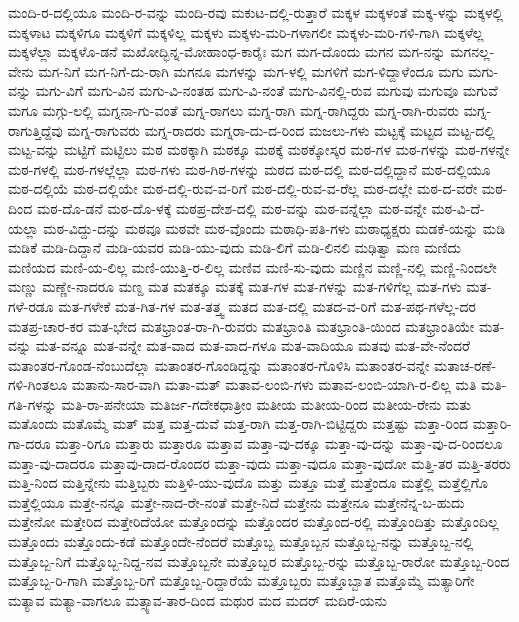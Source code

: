 {ಮಂದಿ-ರ-ದಲ್ಲಿಯೂ
ಮಂದಿ-ರ-ವನ್ನು
ಮಂದಿ-ರವು
ಮಕುಟ-ದಲ್ಲಿ-ರುತ್ತಾರೆ
ಮಕ್ಕಳ
ಮಕ್ಕಳಂತೆ
ಮಕ್ಕ-ಳನ್ನು
ಮಕ್ಕಳಲ್ಲಿ
ಮಕ್ಕಳಾಟ
ಮಕ್ಕಳಿಗೂ
ಮಕ್ಕಳಿಗೆ
ಮಕ್ಕಳಿಲ್ಲ
ಮಕ್ಕಳು
ಮಕ್ಕಳು-ಮರಿ-ಗಳಾಗಲೀ
ಮಕ್ಕಳು-ಮರಿ-ಗಳಿ-ಗಾಗಿ
ಮಕ್ಕಳೆಲ್ಲ
ಮಕ್ಕಳೆಲ್ಲಾ
ಮಕ್ಕಳೊ-ಡನೆ
ಮಖೋದ್ಭಿನ್ನ-ಮೋಹಾಂಧ-ಕಾರೈಃ
ಮಗ
ಮಗ-ದೊಂದು
ಮಗನ
ಮಗ-ನನ್ನು
ಮಗನಲ್ಲ-ವೇನು
ಮಗ-ನಿಗೆ
ಮಗ-ನಿಗೆ-ದು-ರಾಗಿ
ಮಗನೂ
ಮಗಳನ್ನು
ಮಗ-ಳಲ್ಲಿ
ಮಗಳಿಗೆ
ಮಗ-ಳಿದ್ದಾಳೆಂದೂ
ಮಗು
ಮಗು-ವನ್ನು
ಮಗು-ವಿಗೆ
ಮಗು-ವಿನ
ಮಗು-ವಿ-ನಂತಹ
ಮಗು-ವಿ-ನಂತೆ
ಮಗು-ವಿನಲ್ಲಿ-ರುವ
ಮಗುವು
ಮಗುವೂ
ಮಗುವೆ
ಮಗೂ
ಮಗ್ಗು-ಲಲ್ಲಿ
ಮಗ್ನನಾ-ಗು-ವಂತೆ
ಮಗ್ನ-ರಾಗಲು
ಮಗ್ನ-ರಾಗಿ
ಮಗ್ನ-ರಾಗಿದ್ದರು
ಮಗ್ನ-ರಾಗಿ-ರುವರು
ಮಗ್ನ-ರಾಗುತ್ತಿದ್ದೆವು
ಮಗ್ನ-ರಾಗುವರು
ಮಗ್ನ-ರಾದರು
ಮಗ್ನರಾ-ದು-ದ-ರಿಂದ
ಮಜಲು-ಗಳು
ಮಟ್ಟಕ್ಕೆ
ಮಟ್ಟದ
ಮಟ್ಟ-ದಲ್ಲಿ
ಮಟ್ಟ-ವನ್ನು
ಮಟ್ಟಿಗೆ
ಮಟ್ಟಿಲು
ಮಠ
ಮಠಕ್ಕಾಗಿ
ಮಠಕ್ಕೂ
ಮಠಕ್ಕೆ
ಮಠಕ್ಕೋಸ್ಕರ
ಮಠ-ಗಳ
ಮಠ-ಗಳನ್ನು
ಮಠ-ಗಳನ್ನೇ
ಮಠ-ಗಳಲ್ಲಿ
ಮಠ-ಗಳಲ್ಲೆಲ್ಲಾ
ಮಠ-ಗಳು
ಮಠ-ಗಿಠ-ಗಳನ್ನು
ಮಠದ
ಮಠ-ದಲ್ಲಿ
ಮಠ-ದಲ್ಲಿದ್ದಾನೆ
ಮಠ-ದಲ್ಲಿಯೂ
ಮಠ-ದಲ್ಲಿಯೆ
ಮಠ-ದಲ್ಲಿಯೇ
ಮಠ-ದಲ್ಲಿ-ರುವ-ವ-ರಿಗೆ
ಮಠ-ದಲ್ಲಿ-ರುವ-ವ-ರೆಲ್ಲ
ಮಠ-ದಲ್ಲೇ
ಮಠ-ದ-ವರೇ
ಮಠ-ದಿಂದ
ಮಠ-ದೊ-ಡನೆ
ಮಠ-ದೊ-ಳಕ್ಕೆ
ಮಠಪ್ರ-ದೇಶ-ದಲ್ಲಿ
ಮಠ-ವನ್ನು
ಮಠ-ವನ್ನೆಲ್ಲಾ
ಮಠ-ವನ್ನೇ
ಮಠ-ವಿ-ದೆ-ಯಲ್ಲಾ
ಮಠ-ವಿದ್ದು-ದನ್ನು
ಮಠವೂ
ಮಠವೇ
ಮಠ-ವೊಂದು
ಮಠಾಧಿ-ಪತಿ-ಗಳು
ಮಠಾಧ್ಯಕ್ಷರು
ಮಡಕೆ-ಯನ್ನು
ಮಡಿ
ಮಡಿಕೆ
ಮಡಿ-ದಿದ್ದಾನೆ
ಮಡಿ-ಯವರ
ಮಡಿ-ಯು-ವುದು
ಮಡಿ-ಲಿಗೆ
ಮಡಿ-ಲಿನಲಿ
ಮಢಿತ್ವಾ
ಮಣ
ಮಣಿದು
ಮಣಿಯದ
ಮಣಿ-ಯ-ಲಿಲ್ಲ
ಮಣಿ-ಯುತ್ತಿ-ರ-ಲಿಲ್ಲ
ಮಣಿವ
ಮಣಿ-ಸು-ವುದು
ಮಣ್ಣಿನ
ಮಣ್ಣಿ-ನಲ್ಲಿ
ಮಣ್ಣಿ-ನಿಂದಲೇ
ಮಣ್ಣು
ಮಣ್ಣೇ-ನಾದರೂ
ಮಣ್ದ
ಮತ
ಮತಕ್ಕೂ
ಮತಕ್ಕೆ
ಮತ-ಗಳ
ಮತ-ಗಳನ್ನು
ಮತ-ಗಳಿಗೆಲ್ಲ
ಮತ-ಗಳು
ಮತ-ಗಳೆ-ರಡೂ
ಮತ-ಗಳೇಕೆ
ಮತ-ಗಿತ-ಗಳ
ಮತ-ತತ್ತ್ವ
ಮತದ
ಮತ-ದಲ್ಲಿ
ಮತದ-ವ-ರಿಗೆ
ಮತ-ಪಥ-ಗಳೆಲ್ಲ-ದರ
ಮತಪ್ರ-ಚಾರ-ಕರ
ಮತ-ಭೇದ
ಮತಭ್ರಾಂತ-ರಾ-ಗಿ-ರುವರು
ಮತಭ್ರಾಂತಿ
ಮತಭ್ರಾಂತಿ-ಯಿಂದ
ಮತಭ್ರಾಂತಿಯೇ
ಮತ-ವನ್ನು
ಮತ-ವನ್ನೂ
ಮತ-ವನ್ನೇ
ಮತ-ವಾದ
ಮತ-ವಾದ-ಗಳೂ
ಮತ-ವಾದಿಯೂ
ಮತವು
ಮತ-ವೇ-ನೆಂದರೆ
ಮತಾಂತರ-ಗೊಂಡ-ನೆಂಬುದೆಲ್ಲಾ
ಮತಾಂತರ-ಗೊಂಡಿದ್ದನ್ನು
ಮತಾಂತರ-ಗೊಳಿಸಿ
ಮತಾಂತರ-ವನ್ನೇ
ಮತಾಚ-ರಣೆ-ಗಳಿ-ಗಿಂತಲೂ
ಮತಾನು-ಸಾರ-ವಾಗಿ
ಮತಾ-ಮತ್
ಮತಾವ-ಲಂಬಿ-ಗಳು
ಮತಾವ-ಲಂಬಿ-ಯಾಗಿ-ರ-ಲಿಲ್ಲ
ಮತಿ
ಮತಿ-ಗತಿ-ಗಳನ್ನು
ಮತಿ-ರಾ-ಪನೇಯಾ
ಮತಿರ್ಜ-ಗದೇಕಧಾತ್ರೀಂ
ಮತೀಯ
ಮತೀಯ-ರಿಂದ
ಮತೀಯ-ರೇನು
ಮತು
ಮತೊಂದು
ಮತೊಮ್ಮೆ
ಮತ್
ಮತ್ತ
ಮತ್ತ-ದುವೆ
ಮತ್ತ-ರಾಗಿ
ಮತ್ತ-ರಾಗಿ-ಬಿಟ್ಟಿದ್ದರು
ಮತ್ತಷ್ಟು
ಮತ್ತಾ-ರಿಂದ
ಮತ್ತಾರಿ-ಗಾ-ದರೂ
ಮತ್ತಾ-ರಿಗೂ
ಮತ್ತಾರು
ಮತ್ತಾರೂ
ಮತ್ತಾವ
ಮತ್ತಾ-ವು-ದಕ್ಕೂ
ಮತ್ತಾ-ವು-ದನ್ನು
ಮತ್ತಾ-ವು-ದ-ರಿಂದಲೂ
ಮತ್ತಾ-ವು-ದಾದರೂ
ಮತ್ತಾವು-ದಾದ-ರೊಂದರ
ಮತ್ತಾ-ವುದು
ಮತ್ತಾ-ವುದೂ
ಮತ್ತಾ-ವುದೋ
ಮತ್ತಿ-ತರ
ಮತ್ತಿ-ತರರು
ಮತ್ತಿ-ನಿಂದ
ಮತ್ತಿನ್ನೇನು
ಮತ್ತಿಬ್ಬರು
ಮತ್ತಿಳಿ-ಯು-ವುದೊ
ಮತ್ತು
ಮತ್ತೂ
ಮತ್ತೆ
ಮತ್ತೆಂದೂ
ಮತ್ತೆಲ್ಲಿ
ಮತ್ತೆಲ್ಲಿಗೊ
ಮತ್ತೆಲ್ಲಿಯೂ
ಮತ್ತೇ-ನನ್ನೂ
ಮತ್ತೇ-ನಾದ-ರೇ-ನಂತೆ
ಮತ್ತೇ-ನಿದೆ
ಮತ್ತೇನು
ಮತ್ತೇನೂ
ಮತ್ತೇನೆನ್ನ-ಬ-ಹುದು
ಮತ್ತೇನೋ
ಮತ್ತೇರಿದ
ಮತ್ತೇರಿದೆಯೋ
ಮತ್ತೊಂದನ್ನು
ಮತ್ತೊಂದರ
ಮತ್ತೊಂದ-ರಲ್ಲಿ
ಮತ್ತೊಂದಿತ್ತು
ಮತ್ತೊಂದಿಲ್ಲ
ಮತ್ತೊಂದು
ಮತ್ತೊಂದು-ಕಡೆ
ಮತ್ತೊಂದೇ-ನೆಂದರೆ
ಮತ್ತೊಬ್ಬ
ಮತ್ತೊಬ್ಬನ
ಮತ್ತೊಬ್ಬ-ನನ್ನು
ಮತ್ತೊಬ್ಬ-ನಲ್ಲಿ
ಮತ್ತೊಬ್ಬ-ನಿಗೆ
ಮತ್ತೊಬ್ಬ-ನಿದ್ದ-ನವ
ಮತ್ತೊಬ್ಬನೇ
ಮತ್ತೊಬ್ಬರ
ಮತ್ತೊಬ್ಬ-ರನ್ನು
ಮತ್ತೊಬ್ಬ-ರಾರೋ
ಮತ್ತೊಬ್ಬ-ರಿಂದ
ಮತ್ತೊಬ್ಬ-ರಿ-ಗಾಗಿ
ಮತ್ತೊಬ್ಬ-ರಿಗೆ
ಮತ್ತೊಬ್ಬ-ರಿದ್ದಾರೆಯೆ
ಮತ್ತೊಬ್ಬರು
ಮತ್ತೊಬ್ಬಾತ
ಮತ್ತೊಮ್ಮೆ
ಮತ್ಯಾರಿಗೇ
ಮತ್ಯಾವ
ಮತ್ಯಾ-ವಾಗಲೂ
ಮತ್ಸ್ಯಾವ-ತಾರ-ದಿಂದ
ಮಥುರ
ಮದ
ಮದರ್
ಮದಿರೆ-ಯನು
}

